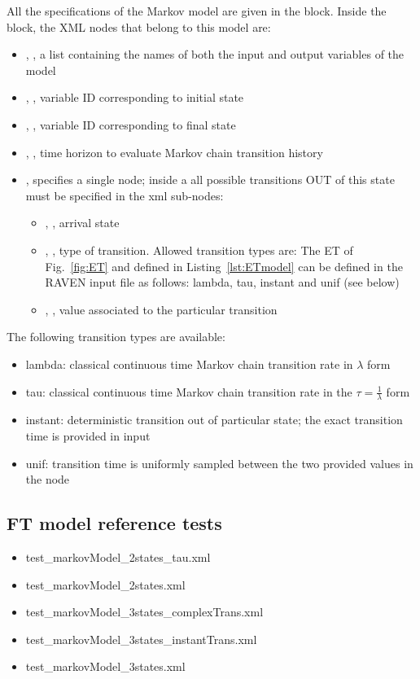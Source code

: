 All the specifications of the Markov model are given in the  block. 
Inside the  block, the XML nodes that belong to this model are:
\begin{itemize}
  \item  {}, , a list containing the names of both the input and output variables of the model
  \item  {}, , variable ID corresponding to initial state
  \item  {}, , variable ID corresponding to final state
  \item  {}, , time horizon to evaluate Markov chain transition history
  \item  {}, specifies a single node; inside a  all possible transitions OUT of this state must be specified
                          in the  xml sub-nodes:
	  \begin{itemize}
	  	\item {}, , arrival state
	    \item {}, , type of transition. Allowed transition types are: The ET of Fig.~\ref{fig:ET} and defined in Listing~\ref{lst:ETmodel} can be defined in the RAVEN input file as follows: lambda, tau, instant and unif (see below)
	    \item {}, , value associated to the particular transition
	  \end{itemize}
\end{itemize}

The following transition types are available:
\begin{itemize}
  \item lambda: classical continuous time Markov chain transition rate in $\lambda$ form
  \item tau: classical continuous time Markov chain transition rate in the $\tau = \frac{1}{\lambda}$ form
  \item instant: deterministic transition out of particular state; the exact transition time is provided in input
  \item unif: transition time is uniformly sampled between the two provided values in the  node
\end{itemize}

\subsection{FT model reference tests}
\begin{itemize}
	\item test\_markovModel\_2states\_tau.xml
	\item test\_markovModel\_2states.xml
	\item test\_markovModel\_3states\_complexTrans.xml
	\item test\_markovModel\_3states\_instantTrans.xml
	\item test\_markovModel\_3states.xml
\end{itemize}
